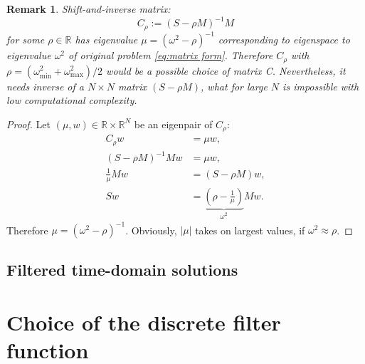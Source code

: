 \documentclass[a4paper,11pt,bibliography=totoc,listof=totoc,headinclude=true,cleardoublepage=empty,oneside]{scrbook}
\newtheorem{rem}[theorem]{Remark}
\newcommand{\R}{\mathbb{R}}
\begin{document}
\begin{rem}
    Shift-and-inverse matrix:
    \begin{equation*}
        C_\rho := (S - \rho M)^{-1}M
    \end{equation*}
    for some $\rho \in \R$ has eigenvalue $\mu = (\omega^2 - \rho)^{-1}$ corresponding to eigenspace to eigenvalue $\omega^2$ of original problem \eqref{eq:matrix form}. Therefore $C_\rho$ with $\rho = (\omega^2_{\min}+\omega^2_{\max})/2 $ would be a possible choice of matrix C. Nevertheless, it needs inverse of a $N\times N$ matrix $(S - \rho M)$, what for large $N$ is impossible with low computational complexity.
\end{rem}
\begin{proof}
    Let $(\mu, w)\in \R\times\R^N$ be an eigenpair of $C_\rho$:
    \begin{align*}
        C_\rho w &= \mu w,  \\
        (S - \rho M)^{-1}Mw &= \mu w, \\
        \frac{1}{\mu}Mw &= (S - \rho M)w, \\
        Sw &= \underbrace{\left(\rho - \frac{1}{\mu}\right)}_{\omega^2} Mw. 
    \end{align*}
    Therefore $\mu = (\omega^2 - \rho)^{-1}$. Obviously, $|\mu|$ takes on largest values, if $\omega^2 \approx \rho$.
\end{proof}

\section{Filtered time-domain solutions}







\chapter{Choice of the discrete filter function}
\label{chapter:dff}
\cite{nannen}\cite{numodes}

 
%

\end{document}

